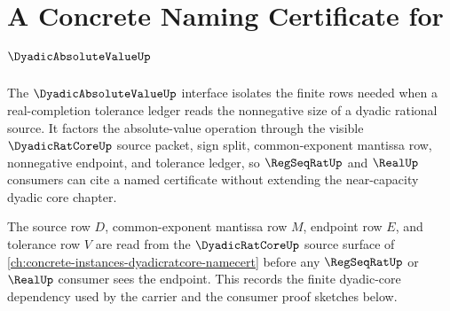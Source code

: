 \chapter{A Concrete Naming Certificate for $\DyadicAbsoluteValueUp$}
\label{ch:concrete-instances-dyadicabsolutevalue-namecert}

The $\DyadicAbsoluteValueUp$ interface isolates the finite rows needed when a real-completion tolerance ledger reads the nonnegative size of a dyadic rational source. It factors the absolute-value operation through the visible $\DyadicRatCoreUp$ source packet, sign split, common-exponent mantissa row, nonnegative endpoint, and tolerance ledger, so $\RegSeqRatUp$ and $\RealUp$ consumers can cite a named certificate without extending the near-capacity dyadic core chapter.

The source row $D$, common-exponent mantissa row $M$, endpoint row $E$, and tolerance row $V$ are read from the $\DyadicRatCoreUp$ source surface of \autoref{ch:concrete-instances-dyadicratcore-namecert} before any $\RegSeqRatUp$ or $\RealUp$ consumer sees the endpoint. This records the finite dyadic-core dependency used by the carrier and the consumer proof sketches below.

